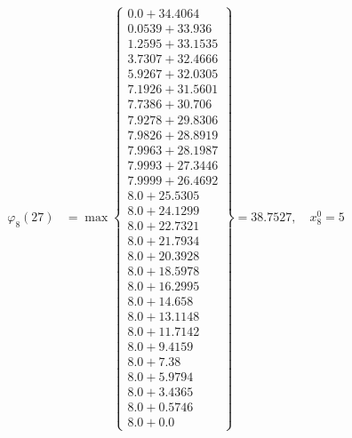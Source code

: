\documentclass{article}
\begin{document}
\begin{align*}
  
\varphi_{8}(27) &= \max \left\{ \begin{array}{c}
0.0 + 34.4064 \\
 0.0539 + 33.936 \\
 1.2595 + 33.1535 \\
 3.7307 + 32.4666 \\
 5.9267 + 32.0305 \\
 7.1926 + 31.5601 \\
 7.7386 + 30.706 \\
 7.9278 + 29.8306 \\
 7.9826 + 28.8919 \\
 7.9963 + 28.1987 \\
 7.9993 + 27.3446 \\
 7.9999 + 26.4692 \\
 8.0 + 25.5305 \\
 8.0 + 24.1299 \\
 8.0 + 22.7321 \\
 8.0 + 21.7934 \\
 8.0 + 20.3928 \\
 8.0 + 18.5978 \\
 8.0 + 16.2995 \\
 8.0 + 14.658 \\
 8.0 + 13.1148 \\
 8.0 + 11.7142 \\
 8.0 + 9.4159 \\
 8.0 + 7.38 \\
 8.0 + 5.9794 \\
 8.0 + 3.4365 \\
 8.0 + 0.5746 \\
 8.0 + 0.0
\end{array} \right\}=38.7527,\quad x_{8}^0=5\\
  
  
  

\end{align*}
\end{document}
